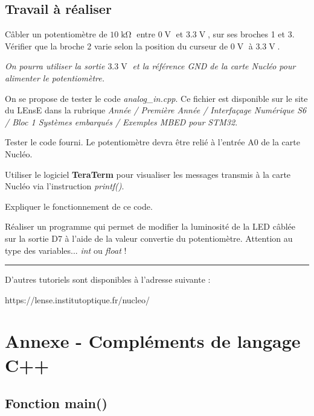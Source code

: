 \documentclass[a4paper,11pt,titlepage]{article} %
\begin{document}
\subsection{Travail à réaliser}

\Manip Câbler un potentiomètre de $10\operatorname{k\Omega}$ entre $0\operatorname{V}$ et $3.3\operatorname{V}$, sur ses broches 1 et 3. Vérifier que la broche 2 varie selon la position du curseur de $0\operatorname{V}$ à $3.3\operatorname{V}$.

\textit{On pourra utiliser la sortie $3.3\operatorname{V}$ et la référence \textit{GND} de la carte Nucléo pour alimenter le potentiomètre.}

\bigskip

On se propose de tester le code \textsl{analog\_in.cpp}. Ce fichier est disponible sur le site du LEnsE dans la rubrique \textit{Année / Première Année / Interfaçage Numérique S6 / Bloc 1 Systèmes embarqués / Exemples MBED pour STM32}.

\Manip Tester le code fourni. Le potentiomètre devra être relié à l'entrée A0 de la carte Nucléo.

\Manip Utiliser le logiciel \textbf{TeraTerm} pour visualiser les messages transmis à la carte Nucléo via l'instruction \textsl{printf()}.

\Quest Expliquer le fonctionnement de ce code.

\Manip Réaliser un programme qui permet de modifier la luminosité de la LED câblée sur la sortie D7 à l'aide de la valeur convertie du potentiomètre. Attention au type des variables... \textit{int} ou \textit{float} !

\bigskip


\noindent \rule{\linewidth}{1pt}

\begin{center}
\Large
D'autres tutoriels sont disponibles à l'adresse suivante :

https://lense.institutoptique.fr/nucleo/
\end{center}


\newpage
\section*{Annexe - Compléments de langage C++}

\subsection*{Fonction main()}
\end{document}
